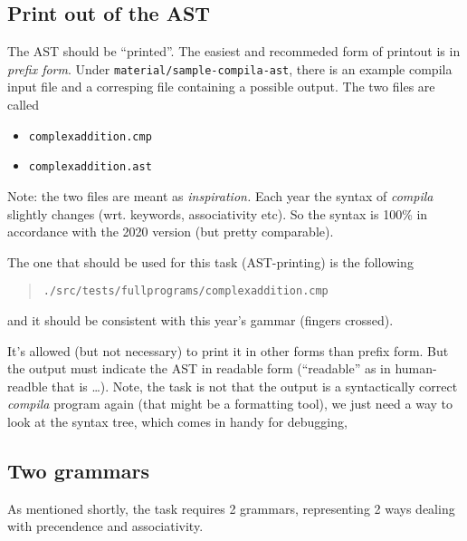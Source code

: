 \documentclass[10pt,freeform]{handout}[2014/08/13]
\begin{document}
\subsection{Print out of the AST}
\label{sec:print-out-ast}


The AST should be ``printed''. The easiest and recommeded form of printout
is in \emph{prefix form}. Under \texttt{material/sample-compila-ast}, there
is an example compila input file and a corresping file containing a
possible output. The two files are called

\begin{itemize}
\item \texttt{complexaddition.cmp}
\item \texttt{complexaddition.ast}
\end{itemize}


Note: the two files are meant as \emph{inspiration.} Each year the syntax
of \textsl{compila} slightly changes (wrt. keywords, associativity etc). So
the syntax is 100\% in accordance with the 2020 version (but pretty
comparable).

The one that should be used for this task (AST-printing) is the following

\begin{quote}
  \texttt{./src/tests/fullprograms/complexaddition.cmp}  
\end{quote}

and it should be consistent with this year's gammar (fingers crossed).



It's allowed (but not necessary) to print it in other forms than prefix
form. But the output must indicate the AST in readable form (``readable''
as in human-readble that is \ldots). Note, the task is not that the output
is a syntactically correct \textsl{compila} program again (that might be a
formatting tool), we just need a way to look at the syntax tree, which
comes in handy for debugging,


%
% 

\subsection{Two grammars}
\label{sec:two-grammars}


As mentioned shortly, the task requires 2 grammars, representing 2 ways
dealing with precendence and associativity.
\end{document}
